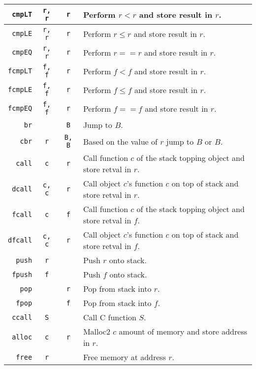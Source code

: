 \documentclass[10pt, onecolumn]{extarticle}
\begin{document}
\begin{longtable}{| r | c | c | l |}
  \texttt{cmpLT} & \texttt{r, r} & \texttt{r} & Perform $r < r$ and store result in $r$.\\\hline
  \texttt{cmpLE} & \texttt{r, r} & \texttt{r} & Perform $r \leq r$ and store result in $r$.\\\hline
  \texttt{cmpEQ} & \texttt{r, r} & \texttt{r} & Perform $r == r$ and store result in $r$.\\\hline\hline

  \texttt{fcmpLT} & \texttt{f, f} & \texttt{r} & Perform $f < f$ and store result in $r$.\\\hline
  \texttt{fcmpLE} & \texttt{f, f} & \texttt{r} & Perform $f \leq f$ and store result in $r$.\\\hline
  \texttt{fcmpEQ} & \texttt{f, f} & \texttt{r} & Perform $f == f$ and store result in $r$.\\\hline\hline
  
  \texttt{br} & \texttt{} & \texttt{B} & Jump to $B$.\\\hline
  \texttt{cbr} & \texttt{r} & \texttt{B, B} & Based on the value of $r$ jump to $B$ or $B$.\\\hline\hline
  
  \texttt{call} & \texttt{c} & \texttt{r} & Call function $c$ of the stack topping object and store retval in $r$.\\\hline
  \texttt{dcall} & \texttt{c, c} & \texttt{r} & Call object $c$'s function $c$ on top of stack and store retval in $r$.\\\hline
  \texttt{fcall} & \texttt{c} & \texttt{f} & Call function $c$ of the stack topping object and store retval in $f$.\\\hline
  \texttt{dfcall} & \texttt{c, c} & \texttt{r} & Call object $c$'s function $c$ on top of stack and store retval in $f$.\\\hline
  \texttt{push} & \texttt{r} & \texttt{} & Push $r$ onto stack.\\\hline
  \texttt{fpush} & \texttt{f} & \texttt{} & Push $f$ onto stack.\\\hline
  \texttt{pop} & \texttt{} & \texttt{r} & Pop from stack into $r$.\\\hline
  \texttt{fpop} & \texttt{} & \texttt{f} & Pop from stack into $f$.\\\hline\hline
  
  \texttt{ccall} & \texttt{S} & \texttt{} & Call C function $S$.\\\hline
  \texttt{alloc} & \texttt{c} & \texttt{r} & Malloc2 $c$ amount of memory and store address in $r$.\\\hline
  \texttt{free} & \texttt{r} & \texttt{} & Free memory at address $r$.\\\hline

\end{longtable}
\end{document}
